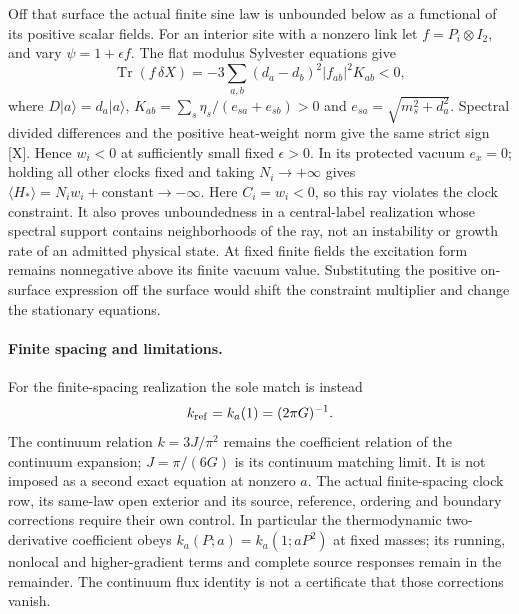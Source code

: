 Off that surface the actual finite sine law is unbounded below as
a functional of its positive scalar fields.
For an interior site with a nonzero link let $f=P_i\otimes I_2$,
and vary $\psi=1+\epsilon f$.
The flat modulus Sylvester equations give
\[
 \operatorname{Tr}(f\,\delta X)
 =-3\sum_{a,b}(d_a-d_b)^2|f_{ab}|^2K_{ab}<0,
\]
where $D|a\rangle=d_a|a\rangle$,
$K_{ab}=\sum_s\eta_s/(e_{sa}+e_{sb})>0$ and
$e_{sa}=\sqrt{m_s^2+d_a^2}$.
Spectral divided differences and the positive heat-weight norm
give the same strict sign [X].  Hence $w_i<0$ at sufficiently
small fixed $\epsilon>0$.  In its protected vacuum $e_x=0$;
holding all other clocks fixed and taking $N_i\to+\infty$ gives
$\langle H_*\rangle=N_iw_i+\text{constant}\to-\infty$.
Here $C_i=w_i<0$, so this ray violates the clock constraint.
It also proves unboundedness in a central-label realization whose
spectral support contains neighborhoods of the ray, not an
instability or growth rate of an admitted physical state.
At fixed finite fields the excitation form remains nonnegative
above its finite vacuum value.  Substituting the positive
on-surface expression off the surface would shift the constraint
multiplier and change the stationary equations.

\paragraph*{Finite spacing and limitations.}
For the finite-spacing realization the sole match is instead
\[
 k_{\rm ref}=k_a(1)=(2\pi G)^{-1}.
\]
The continuum relation $k=3J/\pi^2$ remains the coefficient relation
of the continuum expansion; $J=\pi/(6G)$ is its continuum matching
limit.  It is not imposed as a second exact equation at nonzero $a$.
The actual finite-spacing clock row, its same-law open exterior and
its source, reference, ordering and boundary corrections require
their own control.  In particular the thermodynamic two-derivative
coefficient obeys $k_a(P;a)=k_a(1;aP^2)$ at fixed masses;
its running, nonlocal and higher-gradient terms and complete
source responses remain in the remainder.
The continuum flux identity is not a certificate
that those corrections vanish.

